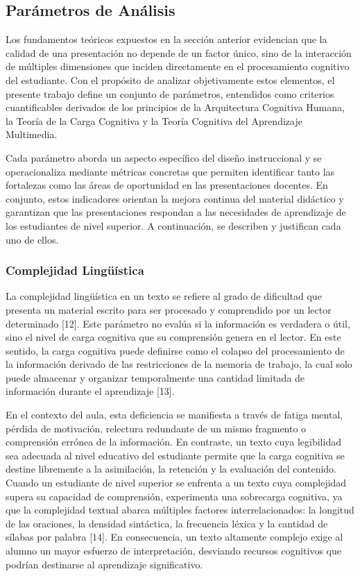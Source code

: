 \documentclass[11pt]{article}
\begin{document}
\clearpage
\subsection*{Parámetros de Análisis}
Los fundamentos teóricos expuestos en la sección anterior evidencian que la calidad de una presentación no depende de un factor único, sino de la interacción de múltiples dimensiones que inciden directamente en el procesamiento cognitivo del estudiante. Con el propósito de analizar objetivamente estos elementos, el presente trabajo define un conjunto de parámetros, entendidos como criterios cuantificables derivados de los principios de la Arquitectura Cognitiva Humana, la Teoría de la Carga Cognitiva y la Teoría Cognitiva del Aprendizaje Multimedia.

Cada parámetro aborda un aspecto específico del diseño instruccional y se operacionaliza mediante métricas concretas que permiten identificar tanto las fortalezas como las áreas de oportunidad en las presentaciones docentes. En conjunto, estos indicadores orientan la mejora continua del material didáctico y garantizan que las presentaciones respondan a las necesidades de aprendizaje de los estudiantes de nivel superior. A continuación, se describen y justifican cada uno de ellos.

\subsubsection*{Complejidad Lingüística}
La complejidad lingüística en un texto se refiere al grado de dificultad que presenta un material escrito para ser procesado y comprendido por un lector determinado [12]. Este parámetro no evalúa si la información es verdadera o útil, sino el nivel de carga cognitiva que su comprensión genera en el lector. En este sentido, la carga cognitiva puede definirse como el colapso del procesamiento de la información derivado de las restricciones de la memoria de trabajo, la cual solo puede almacenar y organizar temporalmente una cantidad limitada de información durante el aprendizaje [13].

En el contexto del aula, esta deficiencia se manifiesta a través de fatiga mental, pérdida de motivación, relectura redundante de un mismo fragmento o comprensión errónea de la información. En contraste, un texto cuya legibilidad sea adecuada al nivel educativo del estudiante permite que la carga cognitiva se destine libremente a la asimilación, la retención y la evaluación del contenido.
Cuando un estudiante de nivel superior se enfrenta a un texto cuya complejidad supera su capacidad de comprensión, experimenta una sobrecarga cognitiva, ya que la complejidad textual abarca múltiples factores interrelacionados: la longitud de las oraciones, la densidad sintáctica, la frecuencia léxica y la cantidad de sílabas por palabra [14]. En consecuencia, un texto altamente complejo exige al alumno un mayor esfuerzo de interpretación, desviando recursos cognitivos que podrían destinarse al aprendizaje significativo.
\end{document}
